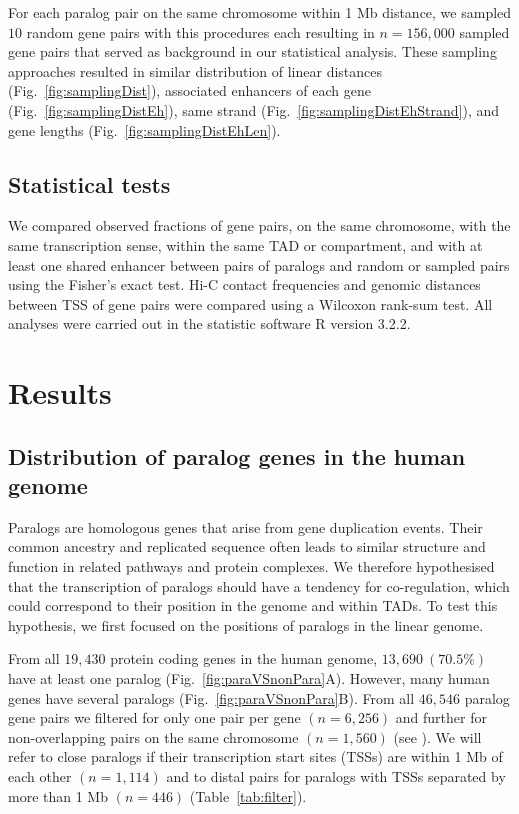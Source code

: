 \documentclass[a4paper,twoside=true,openright,parskip=full,chapterprefix=true,11pt,headings=normal,bibliography=totoc,listof=totoc,titlepage=on,captions=tableabove,draft=false]{scrreprt}
\theoremstyle{definition}
\theoremstyle{definition}
\theoremstyle{definition}
\theoremstyle{remark}
\begin{document}
For each paralog pair on the same chromosome within 1 Mb distance, we
sampled \(10\) random gene pairs with this procedures each resulting in
\(n=156,000\) sampled gene pairs that served as background in our
statistical analysis. These sampling approaches resulted in similar
distribution of linear distances (Fig.~\ref{fig:samplingDist}),
associated enhancers of each gene (Fig.~\ref{fig:samplingDistEh}), same
strand (Fig.~\ref{fig:samplingDistEhStrand}), and gene lengths
(Fig.~\ref{fig:samplingDistEhLen}).

\hypertarget{statistical-tests}{%
\subsection{Statistical tests}\label{statistical-tests}}

We compared observed fractions of gene pairs, on the same chromosome,
with the same transcription sense, within the same TAD or compartment,
and with at least one shared enhancer between pairs of paralogs and
random or sampled pairs using the Fisher's exact test. Hi-C contact
frequencies and genomic distances between TSS of gene pairs were
compared using a Wilcoxon rank-sum test. All analyses were carried out
in the statistic software R version 3.2.2.

\hypertarget{results}{%
\section{Results}\label{results}}

\hypertarget{distribution-of-paralog-genes-in-the-human-genome}{%
\subsection{Distribution of paralog genes in the human
genome}\label{distribution-of-paralog-genes-in-the-human-genome}}

Paralogs are homologous genes that arise from gene duplication events.
Their common ancestry and replicated sequence often leads to similar
structure and function in related pathways and protein complexes. We
therefore hypothesised that the transcription of paralogs should have a
tendency for co-regulation, which could correspond to their position in
the genome and within TADs. To test this hypothesis, we first focused on
the positions of paralogs in the linear genome.

From all \(19,430\) protein coding genes in the human genome,
\(13,690~(70.5\%)\) have at least one paralog
(Fig.~\ref{fig:paraVSnonPara}A). However, many human genes have several
paralogs (Fig.~\ref{fig:paraVSnonPara}B). From all \(46,546\) paralog
gene pairs we filtered for only one pair per gene \((n=6,256)\) and
further for non-overlapping pairs on the same chromosome \((n=1,560)\)
(see ). We will refer to close paralogs if their transcription start
sites (TSSs) are within 1 Mb of each other \((n=1,114)\) and to distal
pairs for paralogs with TSSs separated by more than 1 Mb \((n=446)\)
(Table~\ref{tab:filter}).
\end{document}

